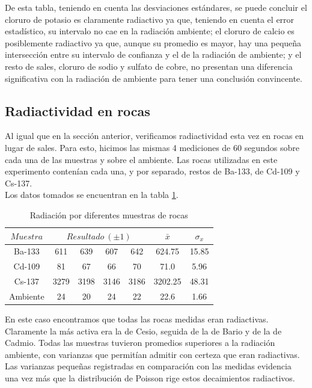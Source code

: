 \documentclass[%
 reprint,
 amsmath,amssymb,
 aps,
]{revtex4-1}
\begin{document}
De esta tabla, teniendo en cuenta las desviaciones estándares, se puede concluir el cloruro de potasio es claramente radiactivo ya que, teniendo en cuenta el error estadístico, su intervalo no cae en la radiación ambiente; el cloruro de calcio es posiblemente radiactivo ya que, aunque su promedio es mayor, hay una pequeña intersección entre su intervalo de confianza y el de la radiación de ambiente; y el resto de sales, cloruro de sodio y sulfato de cobre, no presentan una diferencia significativa con la radiación de ambiente para tener una conclusión convincente.\\

\subsection{\label{sec:level2}Radiactividad en rocas} 
Al igual que en la sección anterior, verificamos radiactividad esta vez en rocas en lugar de sales. Para esto, hicimos las mismas 4 mediciones de 60 segundos sobre cada una de las muestras y sobre el ambiente. Las rocas utilizadas en este experimento contenían cada una, y por separado, restos de Ba-133, de Cd-109 y Cs-137.\\

Los datos tomados se encuentran en la tabla \ref{table:rocas}.\\

\begin{table}[h!]
\centering
\begin{tabular}{|c|c|c|c|c|c|c|}
	\hline $ Muestra $ & \multicolumn{4}{c|}{$Resultado\ (\pm 1)$ } & $\bar{x}$& $\sigma_x$ \\ 
	\hline\hline
	Ba-133&611&639&607&642&624.75&15.85\\
	Cd-109&81&67&66&70&71.0&5.96\\
	Cs-137&3279&3198&3146&3186&3202.25&48.31\\
	Ambiente&24&20&24&22&22.6&1.66\\
	[1ex] 
 \hline
 \end{tabular} 
  \caption{Radiación por diferentes muestras de rocas}
\label{table:rocas} 
\end{table}

En este caso encontramos que todas las rocas medidas eran radiactivas. Claramente la más activa era la de Cesio, seguida de la de Bario y de la de Cadmio. Todas las muestras tuvieron promedios superiores a la radiación ambiente, con varianzas que permitían admitir con certeza que eran radiactivas. Las varianzas pequeñas registradas en comparación con las medidas evidencia una vez más que la distribución de Poisson rige estos decaimientos radiactivos.\\
\end{document}
